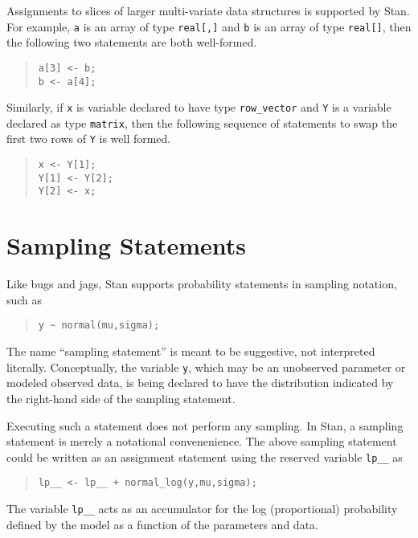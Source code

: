 \documentclass[10pt]{report}
\newcommand{\Stan}{Stan\xspace}
\newcommand{\acronym}[1]{{\sc #1}\xspace}
\newcommand{\BUGS}{\acronym{bugs}}
\newcommand{\JAGS}{\acronym{jags}}
\newcommand{\code}[1]{{\tt #1}}
\begin{document}
Assignments to slices of larger multi-variate data structures is
supported by \Stan.  For example, \code{a} is an array of type
\code{real[,]} and \code{b} is an array of type \code{real[]}, then
the following two statements are both well-formed.
%
\begin{quote}
\begin{Verbatim}
a[3] <- b;
b <- a[4];
\end{Verbatim}
\end{quote}
%
Similarly, if \code{x} is variable declared to have type
\code{row\_vector} and \code{Y} is a variable declared as type
\code{matrix}, then the following sequence of statements to swap the
first two rows of \code{Y} is well formed.
%
\begin{quote}
\begin{Verbatim}
x <- Y[1];
Y[1] <- Y[2];
Y[2] <- x;
\end{Verbatim}
\end{quote}

\section{Sampling Statements}

Like \BUGS and \JAGS, \Stan supports probability statements in
sampling notation, such as
%
\begin{quote}
\begin{Verbatim}
y ~ normal(mu,sigma);
\end{Verbatim}
\end{quote}
%
The name ``sampling statement'' is meant to be suggestive, not
interpreted literally.  Conceptually, the variable \code{y}, which may
be an unobserved parameter or modeled observed data, is being declared
to have the distribution indicated by the right-hand side of the
sampling statement.

Executing such a statement does not perform any sampling.  In \Stan, a
sampling statement is merely a notational convenenience.  The above
sampling statement could be written as an assignment statement using
the reserved variable \code{lp\_\_} as
%
\begin{quote}
\begin{Verbatim}
lp__ <- lp__ + normal_log(y,mu,sigma);
\end{Verbatim}
\end{quote}
%
The variable \code{lp\_\_} acts as an accumulator for the log
(proportional) probability defined by the model as a function of the
parameters and data.
\end{document}
